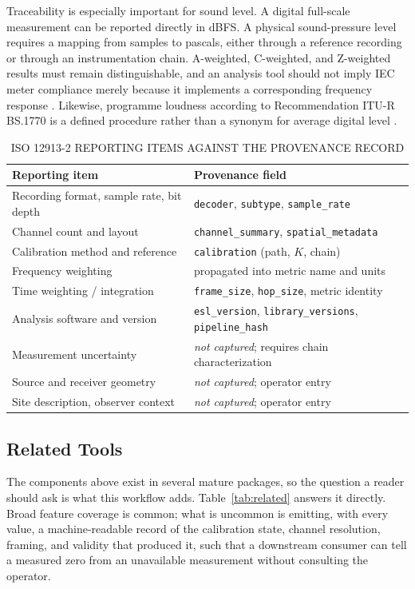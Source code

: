 \documentclass[final]{jaes}
\begin{document}
Traceability is especially important for sound level. A digital full-scale measurement can be reported directly in dBFS. A physical sound-pressure level requires a mapping from samples to pascals, either through a reference recording or through an instrumentation chain. A-weighted, C-weighted, and Z-weighted results must remain distinguishable, and an analysis tool should not imply IEC meter compliance merely because it implements a corresponding frequency response \cite{iec61672}. Likewise, programme loudness according to Recommendation ITU-R BS.1770 is a defined procedure rather than a synonym for average digital level \cite{itu1770}.

\begin{table}[t]
\caption{ISO 12913-2 REPORTING ITEMS AGAINST THE PROVENANCE RECORD}
\label{tab:iso}
\centering
\small
\begin{tabular}{@{}p{}p{}@{}}
\toprule
Reporting item & Provenance field \\
\midrule
Recording format, sample rate, bit depth & \texttt{decoder}, \texttt{subtype}, \texttt{sample\_rate} \\
Channel count and layout & \texttt{channel\_summary}, \texttt{spatial\_metadata} \\
Calibration method and reference & \texttt{calibration} (path, $K$, chain) \\
Frequency weighting & propagated into metric name and units \\
Time weighting / integration & \texttt{frame\_size}, \texttt{hop\_size}, metric identity \\
Analysis software and version & \texttt{esl\_version}, \texttt{library\_versions}, \texttt{pipeline\_hash} \\
Measurement uncertainty & \emph{not captured}; requires chain characterization \\
Source and receiver geometry & \emph{not captured}; operator entry \\
Site description, observer context & \emph{not captured}; operator entry \\
\bottomrule
\end{tabular}
\end{table}

\subsection{Related Tools}

The components above exist in several mature packages, so the question a reader should ask is what this workflow adds. Table~\ref{tab:related} answers it directly. Broad feature coverage is common; what is uncommon is emitting, with every value, a machine-readable record of the calibration state, channel resolution, framing, and validity that produced it, such that a downstream consumer can tell a measured zero from an unavailable measurement without consulting the operator.
\end{document}
